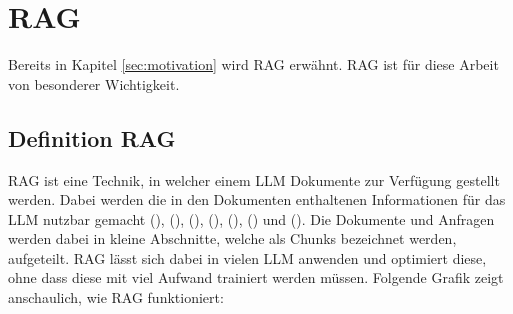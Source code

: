 \documentclass[12pt,toc=bib,toc=listof]{scrreprt}
\begin{document}
\section{RAG} %
\label{sec:rag}
Bereits in Kapitel \ref{sec:motivation} wird RAG erwähnt. RAG ist für diese Arbeit von besonderer Wichtigkeit. 

\subsection{Definition RAG} %
\label{sec:definitionRAG}
RAG ist eine Technik, in welcher einem LLM Dokumente zur Verfügung gestellt werden. Dabei werden die in den Dokumenten enthaltenen Informationen für das LLM nutzbar gemacht (\cite{Gao2024}), (\cite{Honroth2024}), (\cite{Lewis2021}), (\cite{Miesle2023}), (\cite{Salemi2024}), (\cite{Schmid2024}) und (\cite{Wu2024}). Die Dokumente und Anfragen werden dabei in kleine Abschnitte, welche als Chunks bezeichnet werden, aufgeteilt. RAG lässt sich dabei in vielen LLM anwenden und optimiert diese, ohne dass diese mit viel Aufwand trainiert werden müssen. Folgende Grafik zeigt anschaulich, wie RAG funktioniert:
\end{document}
